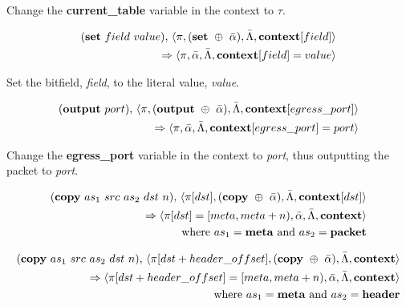 Change the \textbf{current\_table} variable in the context to $\tau$.

\begin{equation}
\begin{split}
  (\textrm{\textbf{set}} \ field \ value) \textrm{,} \ \langle \pi, (\textrm{\textbf{set}} \ \oplus \ \bar \alpha), \bar \Lambda,
  \textbf{\textrm{context}}[field] \rangle \\
  \Rightarrow \langle \pi, \bar \alpha, \bar \Lambda,
  \textbf{\textrm{context}}[field] = value \rangle
\end{split}
\end{equation}

Set the bitfield, \textit{field}, to the literal value, \textit{value}.

\begin{equation}
\begin{split}
  (\textrm{\textbf{output}} \ port) \textrm{,} \ \langle \pi, (\textrm{\textbf{output}} \ \oplus \ \bar \alpha), \bar \Lambda,
  \textbf{\textrm{context}}[egress\_port] \rangle \\
  \Rightarrow 
  \langle \pi, \bar \alpha, \bar \Lambda,
  \textbf{\textrm{context}}[egress\_port] = port \rangle
\end{split}
\end{equation}

Change the \textbf{egress\_port} variable in the context to \textit{port}, thus outputting the packet to \textit{port}.

\begin{equation}
\begin{split}
  (\textrm{\textbf{copy}} \ as_1 \ src \ as_2 \ dst \ n)
  \textrm{,} \ \langle \pi[dst], (\textbf{\textrm{copy}} \ \oplus \ \bar \alpha), \bar \Lambda, \textrm{\textbf{context}}[dst] \rangle \\ \Rightarrow
  \langle \pi[dst] = [meta, meta + n), \bar \alpha, \bar \Lambda, \textrm{\textbf{context}} \rangle \\
    \textrm{where} \ as_1 = \textrm{\textbf{meta} and } as_2 =
    \textrm{\textbf{packet}}
\end{split}
\end{equation}

\begin{equation}
\begin{split}
  (\textrm{\textbf{copy}} \ as_1 \ src \ as_2 \ dst \ n)
  \textrm{,} \ \langle \pi[dst + header\_offset], (\textbf{\textrm{copy}} \ \oplus \ \bar \alpha), \bar \Lambda, \textrm{\textbf{context}} \rangle \\
  \Rightarrow
  \langle \pi[dst + header\_offset] = [meta, meta + n), \bar \alpha, \bar \Lambda, \textrm{\textbf{context}} \rangle \\
    \textrm{where} \ as_1 = \textrm{\textbf{meta} and } as_2 =
    \textrm{\textbf{header}}
\end{split}
\end{equation}

